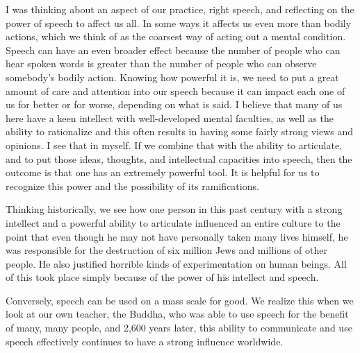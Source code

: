 
I was thinking about an aspect of our practice, right speech, and 
reflecting on the power of speech to affect us all. In some ways it 
affects us even more than bodily actions, which we think of as the 
coarsest way of acting out a mental condition. Speech can have an even 
broader effect because the number of people who can hear spoken words 
is greater than the number of people who can observe somebody's bodily 
action. Knowing how powerful it is, we need to put a great amount of 
care and attention into our speech because it can impact each one of us 
for better or for worse, depending on what is said. I believe that many 
of us here have a keen intellect with well-developed mental faculties, 
as well as the ability to rationalize and this often results in having 
some fairly strong views and opinions. I see that in myself. If we 
combine that with the ability to articulate, and to put those ideas, 
thoughts, and intellectual capacities into speech, then the outcome is 
that one has an extremely powerful tool. It is helpful for us to 
recognize this power and the possibility of its ramifications.

Thinking historically, we see how one person in this past century with 
a strong intellect and a powerful ability to articulate influenced an 
entire culture to the point that even though he may not have personally 
taken many lives himself, he was responsible for the destruction of six 
million Jews and millions of other people. He also justified horrible 
kinds of \mbox{experimentation} on human beings. All of this took place simply 
because of the power of his intellect and speech.

Conversely, speech can be used on a mass scale for good. We realize 
this when we look at our own teacher, the Buddha, who was able to use 
speech for the benefit of many, many people, and 2,600 years later, 
this ability to communicate and use speech effectively continues to 
have a strong influence worldwide.

